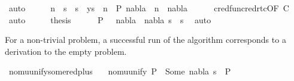 \begin{isabellebody}
\ auto\isanewline
\ \ \isamarkupfalse%
\ \isamarkupfalse%
\ n\ \ {\isachardoublequoteopen}s{}\ {\isacharequal}{\kern0pt}\ s{}{\isachardoublequoteclose}\ {\isachardoublequoteopen}{\isacharparenleft}{\kern0pt}{\isacharbrackleft}{\kern0pt}{\isacharbrackright}{\kern0pt}{\isacharcomma}{\kern0pt}\ ys{\isacharparenright}{\kern0pt}\ {\isasymturnstile}\ n\ {\isasymrightarrow}\isactrlsup {\isacharasterisk}{\kern0pt}\ P{}{\isachardoublequoteclose}\ {\isachardoublequoteopen}nabla{}\ {\isacharequal}{\kern0pt}\ n\ {\isasymunion}\ nabla{}{\isachardoublequoteclose}\isanewline
\ \ \ \ \isamarkupfalse%
\ cred{\isacharunderscore}{\kern0pt}fun{\isacharunderscore}{\kern0pt}cred{\isacharunderscore}{\kern0pt}rtc{\isacharbrackleft}{\kern0pt}OF\ C{\isacharbrackright}{\kern0pt}\ \isamarkupfalse%
\ auto\isanewline
\ \ \isamarkupfalse%
\ \isamarkupfalse%
\ {\isacharquery}{\kern0pt}thesis\isanewline
\ \ \ \ \isamarkupfalse%
\ {\isacartoucheopen}P{}\ {\isacharequal}{\kern0pt}\ {\isacharparenleft}{\kern0pt}{\isacharbrackleft}{\kern0pt}{\isacharbrackright}{\kern0pt}{\isacharcomma}{\kern0pt}{\isacharbrackleft}{\kern0pt}{\isacharbrackright}{\kern0pt}{\isacharparenright}{\kern0pt}{\isacartoucheclose}\ {\isacartoucheopen}nabla{}\ {\isacharequal}{\kern0pt}\ nabla{\isacartoucheclose}\ {\isacartoucheopen}s{}\ {\isacharequal}{\kern0pt}\ s{\isacartoucheclose}\ \isamarkupfalse%
\ auto\isanewline
{}\isamarkupfalse%
%
\endisatagproof
{\isafoldproof}%
%
\isadelimproof
%
\endisadelimproof
%
\begin{isamarkuptext}%
For a non-trivial problem, a successful run of the algorithm corresponds to a  
derivation to the empty problem.%
\end{isamarkuptext}\isamarkuptrue%
\isamarkupfalse%
\ nomu{\isacharunderscore}{\kern0pt}unify{\isacharunderscore}{\kern0pt}some{\isacharunderscore}{\kern0pt}red{\isacharunderscore}{\kern0pt}plus{\isacharcolon}{\kern0pt}\isanewline
\ \ \ {\isachardoublequoteopen}nomu{\isacharunderscore}{\kern0pt}unify\ P\ {\isacharequal}{\kern0pt}\ Some\ {\isacharparenleft}{\kern0pt}nabla{\isacharcomma}{\kern0pt}\ s{\isacharparenright}{\kern0pt}{\isachardoublequoteclose}\ \ {\isachardoublequoteopen}P\ {\isasymnoteq}\ {\isacharparenleft}{\kern0pt}{\isacharbrackleft}{\kern0pt}{\isacharbrackright}{\kern0pt}{\isacharcomma}{\kern0pt}{\isacharbrackleft}{\kern0pt}{\isacharbrackright}{\kern0pt}{\isacharparenright}{\kern0pt}{\isachardoublequoteclose}\isanewline

\end{isabellebody}
